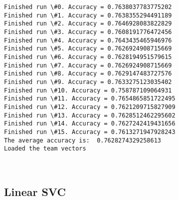\documentclass[11pt]{article}
\begin{document}
    \begin{Verbatim}[commandchars=\\\{\}]
Finished run \#0. Accuracy = 0.7638037783775202
Finished run \#1. Accuracy = 0.7638355294491189
Finished run \#2. Accuracy = 0.7646928083822829
Finished run \#3. Accuracy = 0.7608191776472456
Finished run \#4. Accuracy = 0.7643435465946976
Finished run \#5. Accuracy = 0.7626924908715669
Finished run \#6. Accuracy = 0.7628194951579615
Finished run \#7. Accuracy = 0.7626924908715669
Finished run \#8. Accuracy = 0.7629147483727576
Finished run \#9. Accuracy = 0.7633275123035402
Finished run \#10. Accuracy = 0.758787109064931
Finished run \#11. Accuracy = 0.7654865851722495
Finished run \#12. Accuracy = 0.7621209715827909
Finished run \#13. Accuracy = 0.7628512462295602
Finished run \#14. Accuracy = 0.7627242419431656
Finished run \#15. Accuracy = 0.7613271947928243
The average accuracy is:  0.7628274329258613
Loaded the team vectors

    \end{Verbatim}

    \begin{center}
    \end{center}
    { \hspace*{\fill} \\}
    
    \hypertarget{linear-svc}{%
\subsection{Linear SVC}\label{linear-svc}}
\end{document}
